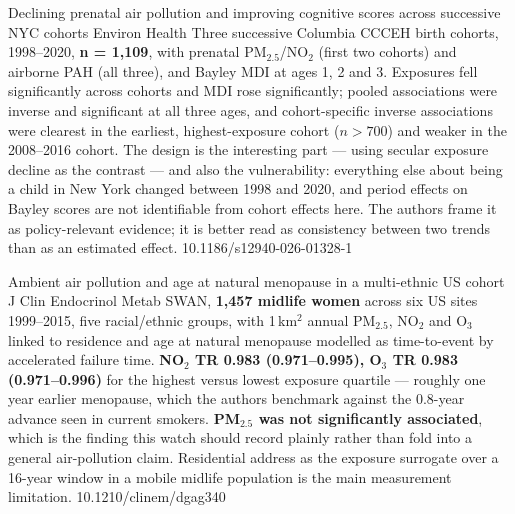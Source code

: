 \documentclass[10pt]{article}
\begin{document}
{Declining prenatal air pollution and improving cognitive scores across successive NYC cohorts}
{Environ Health}
{Three successive Columbia CCCEH birth cohorts, 1998--2020, \textbf{n = 1,109}, with
prenatal PM$_{2.5}$/NO$_2$ (first two cohorts) and airborne PAH (all three), and Bayley
MDI at ages 1, 2 and 3. Exposures fell significantly across cohorts and MDI rose
significantly; pooled associations were inverse and significant at all three ages, and
cohort-specific inverse associations were clearest in the earliest, highest-exposure
cohort ($n > 700$) and weaker in the 2008--2016 cohort. The design is the interesting
part --- using secular exposure decline as the contrast --- and also the vulnerability:
everything else about being a child in New York changed between 1998 and 2020, and
period effects on Bayley scores are not identifiable from cohort effects here. The
authors frame it as policy-relevant evidence; it is better read as consistency between two
trends than as an estimated effect.}
{10.1186/s12940-026-01328-1}


{Ambient air pollution and age at natural menopause in a multi-ethnic US cohort}
{J Clin Endocrinol Metab}
{SWAN, \textbf{1,457 midlife women} across six US sites 1999--2015, five racial/ethnic
groups, with 1\,km$^2$ annual PM$_{2.5}$, NO$_2$ and O$_3$ linked to residence and age at
natural menopause modelled as time-to-event by accelerated failure time.
\textbf{NO$_2$ TR 0.983 (0.971--0.995), O$_3$ TR 0.983 (0.971--0.996)} for the highest
versus lowest exposure quartile --- roughly one year earlier menopause, which the authors
benchmark against the 0.8-year advance seen in current smokers.
\textbf{PM$_{2.5}$ was not significantly associated}, which is the finding this watch
should record plainly rather than fold into a general air-pollution claim. Residential
address as the exposure surrogate over a 16-year window in a mobile midlife population is
the main measurement limitation.}
{10.1210/clinem/dgag340}

\end{document}
